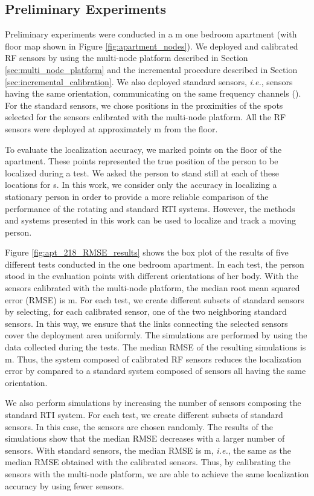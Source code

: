 \documentclass[conference]{IEEEtran}
\begin{document}
\subsection{Preliminary Experiments}
\label{sec:one_bedroom_apartment_deployment}

Preliminary experiments were conducted in a  m one bedroom apartment (with floor map shown in Figure \ref{fig:apartment_nodes}). We deployed and calibrated  RF sensors by using the multi-node platform described in Section \ref{sec:multi_node_platform} and the incremental procedure described in Section \ref{sec:incremental_calibration}. We also deployed  standard sensors, \emph{i.e.}, sensors having the same orientation, communicating on the same frequency channels (). For the standard sensors, we chose positions in the proximities of the spots selected for the sensors calibrated with the multi-node platform. All the RF sensors were deployed at approximately  m from the floor.

To evaluate the localization accuracy, we marked  points on the floor of the apartment. These points represented the true position of the person to be localized during a test. We asked the person to stand still at each of these locations for  s. In this work, we consider only the accuracy in localizing a stationary person in order to provide a more reliable comparison of the performance of the rotating and standard RTI systems. However, the methods and systems presented in this work can be used to localize and track a moving person.

Figure \ref{fig:apt_218_RMSE_results} shows the box plot of the results of five different tests conducted in the one bedroom apartment. In each test, the person stood in the  evaluation points with different orientations of her body. With the  sensors calibrated with the multi-node platform, the median root mean squared error (RMSE) is  m. For each test, we create  different subsets of  standard sensors by selecting, for each calibrated sensor, one of the two neighboring standard sensors. In this way, we ensure that the links connecting the selected sensors cover the deployment area uniformly. The simulations are performed by using the data collected during the tests. The median RMSE of the resulting  simulations is  m. Thus, the system composed of calibrated RF sensors reduces the localization error by  compared to a standard system composed of sensors all having the same orientation.

We also perform simulations by increasing the number of sensors composing the standard RTI system. For each test, we create   different subsets of standard sensors. In this case, the sensors are chosen randomly. The results of the simulations show that the median RMSE decreases with a larger number of sensors. With  standard sensors, the median RMSE is  m, \emph{i.e.}, the same as the median RMSE obtained with the calibrated sensors. Thus, by calibrating the sensors with the multi-node platform, we are able to achieve the same localization accuracy by using  fewer sensors.
\end{document}

